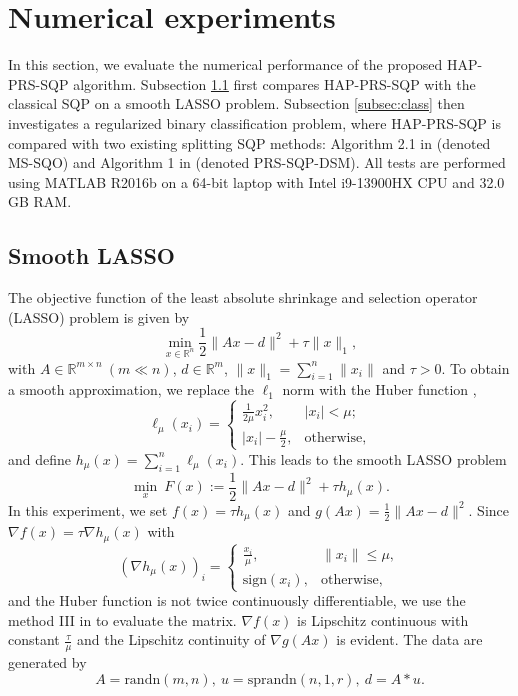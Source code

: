\documentclass[pdflatex,sn-mathphys-num]{sn-jnl}%
\theoremstyle{thmstyleone}%
\theoremstyle{thmstyletwo}%
\theoremstyle{thmstylethree}%
\begin{document}
\section{Numerical experiments}\label{sec5}
In this section, we evaluate the numerical performance of the proposed HAP-PRS-SQP algorithm. Subsection \ref{subsec:lasso} first compares HAP-PRS-SQP with the classical SQP on a smooth LASSO problem. Subsection \ref{subsec:class} then investigates a regularized binary classification problem, where HAP-PRS-SQP is compared with two existing splitting SQP methods: Algorithm 2.1 in \cite{JZY20} (denoted MS-SQO) and Algorithm 1 in \cite{JZY22} (denoted PRS-SQP-DSM). All tests are performed using MATLAB R2016b on a 64-bit laptop with Intel i9-13900HX CPU and 32.0 GB RAM. 

\subsection{Smooth LASSO}\label{subsec:lasso}
The objective function of the least absolute shrinkage and selection operator (LASSO) problem is given by
\[
	\min _{x\in \mathbb{R}^n}\frac{1}{2}\|Ax-d\|^2+\tau\|x\|_1,
\]
with $A\in \mathbb{R}^{m \times n}~(m\ll n)$, $d \in \mathbb{R}^m$, $\|x\|_1=\sum_{i=1}^n\|x_i\|$ and $\tau>0$. 
To obtain a smooth approximation, we replace the $\ell_1$ norm with the Huber function \cite{Huber1964}, 
$$
\ell_\mu(x_i)=
\begin{cases}
	\frac{1}{2 \mu} x_i^2, & |x_i|<\mu; \\
	|x_i|-\frac{\mu}{2}, & \text {otherwise},
\end{cases}
$$
and define $h_\mu(x)=\sum_{i=1}^n \ell_\mu(x_i)$. This leads to the smooth LASSO problem
\begin{equation}\label{HELASSO}
	\min_x~F(x):= \frac{1}{2}\|Ax-d\|^2+\tau h_\mu(x).
\end{equation}
In this experiment, we set $f(x)=\tau h_\mu(x)$ and $g(Ax)=\frac{1}{2}\|Ax-d\|^2$. Since $\nabla f(x)=\tau \nabla h_\mu(x)$ with
\[
(\nabla h_\mu(x))_i=
\begin{cases}
	\frac{x_i}{\mu}, & \|x_i\| \leq \mu,\\
	\text{sign}(x_i), & \text {otherwise},
\end{cases}
\]
and the Huber function is not twice continuously differentiable, we use the method III in \cite[Section 5]{JLY21} to evaluate the matrix. $\nabla f(x)$ is Lipschitz continuous with constant $\frac{\tau}{\mu}$ and the Lipschitz continuity of $\nabla g(Ax)$ is evident. The data are generated by 
\[A = \text{randn}(m, n),~u = \text{sprandn}(n, 1, r),~d = A * u.\]
\end{document}
